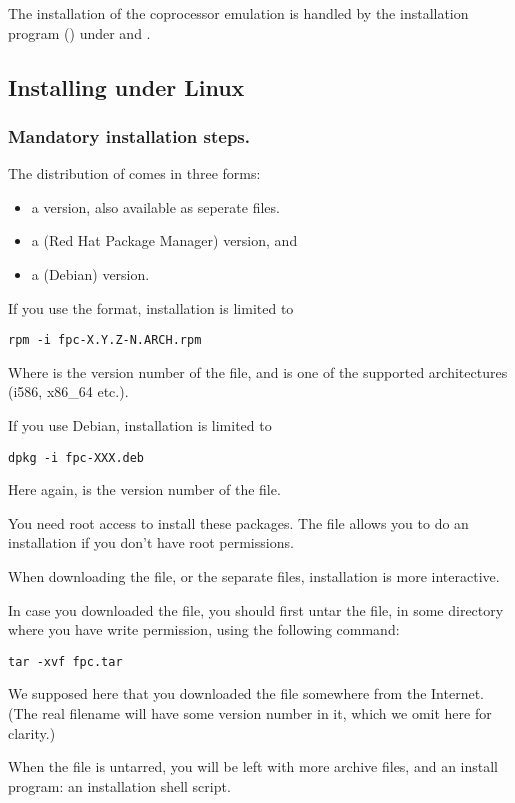 The installation of the coprocessor emulation is handled by the
installation program () under \dos and \windows.

%
%
\subsection{Installing under Linux}
\subsubsection{Mandatory installation steps.}
The \linux distribution of \fpc comes in three forms:
\begin{itemize}
\item a  version, also available as seperate files.
\item a  (Red Hat Package Manager) version, and
\item a  (Debian) version.
\end{itemize}

If you use the  format, installation is limited to
\begin{verbatim}
rpm -i fpc-X.Y.Z-N.ARCH.rpm
\end{verbatim}
Where  is the version number of the  file, and  is one of the supported architectures (i586, x86\_64 etc.).

If you use Debian, installation is limited to
\begin{verbatim}
dpkg -i fpc-XXX.deb
\end{verbatim}
Here again,  is the version number of the  file.

You need root access to install these packages. The  file
allows you to do an installation if you don't have root permissions.

When downloading the  file, or the separate files,
installation is more interactive.

In case you downloaded the  file, you should first untar
the file, in some directory where
you have write permission, using the following command:
\begin{verbatim}
tar -xvf fpc.tar
\end{verbatim}
We supposed here that you downloaded the file  somewhere
from the Internet. (The real filename will have some version number in it,
which we omit here for clarity.)

When the file is untarred, you will be left with more archive files, and
an install program: an installation shell script.


